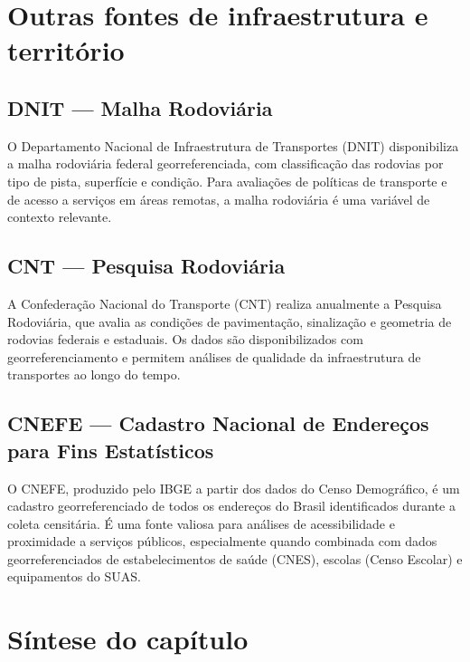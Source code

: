 \section{Outras fontes de infraestrutura e território}

\subsection{DNIT --- Malha Rodoviária}

O Departamento Nacional de Infraestrutura de Transportes (DNIT) disponibiliza a malha rodoviária federal georreferenciada, com classificação das rodovias por tipo de pista, superfície e condição. Para avaliações de políticas de transporte e de acesso a serviços em áreas remotas, a malha rodoviária é uma variável de contexto relevante.

\subsection{CNT --- Pesquisa Rodoviária}

A Confederação Nacional do Transporte (CNT) realiza anualmente a Pesquisa Rodoviária, que avalia as condições de pavimentação, sinalização e geometria de rodovias federais e estaduais. Os dados são disponibilizados com georreferenciamento e permitem análises de qualidade da infraestrutura de transportes ao longo do tempo.

\subsection{CNEFE --- Cadastro Nacional de Endereços para Fins Estatísticos}

O CNEFE, produzido pelo IBGE a partir dos dados do Censo Demográfico, é um cadastro georreferenciado de todos os endereços do Brasil identificados durante a coleta censitária. É uma fonte valiosa para análises de acessibilidade e proximidade a serviços públicos, especialmente quando combinada com dados georreferenciados de estabelecimentos de saúde (CNES), escolas (Censo Escolar) e equipamentos do SUAS.

\section{Síntese do capítulo}

